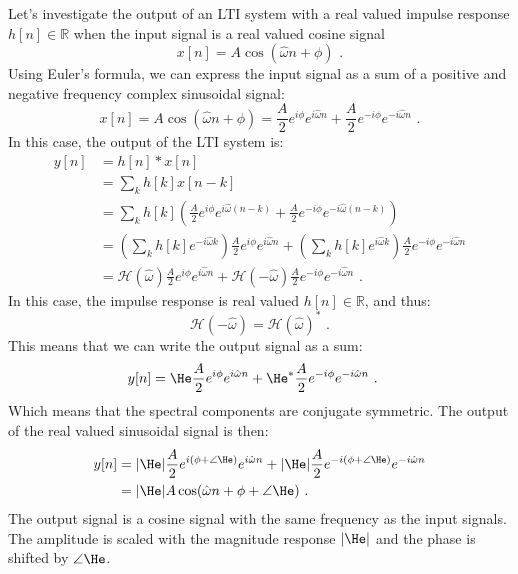 Let's investigate the output of an LTI system with a real valued
impulse response $h[n]\in\mathbb{R}$ when the input signal is a real
valued cosine signal
\begin{equation}
x[n] = A\cos(\hat{\omega} n + \phi)\,\,.
\end{equation}
Using Euler's formula, we can express the input signal as a sum of a
positive and negative frequency complex sinusoidal signal:
\begin{equation}
x[n] = A \cos(\hat{\omega} n + \phi) = \frac{A}{2}e^{i\phi}e^{i\hat{\omega} n} + \frac{A}{2}e^{-i\phi}e^{-i\hat{\omega} n}\,\,.
\end{equation}
In this case, the output of the LTI system is:
\begin{align}
y[n] &= h[n]*x[n]\\
&= \sum_{k} h[k]x[n-k]\\
&= \sum_{k} h[k] \left( \frac{A}{2}e^{i\phi}e^{i\hat{\omega} (n-k)} + \frac{A}{2}e^{-i\phi}e^{-i\hat{\omega} (n-k)} \right)\\
 &= \left(\sum_{k} h[k] e^{-i\hat{\omega} k}\right) \frac{A}{2}e^{i\phi}e^{i\hat{\omega} n} + \left(\sum_{k} h[k] e^{i\hat{\omega} k}\right) \frac{A}{2}e^{-i\phi} e^{-i\hat{\omega} n}\\
 &= \mathcal{H}(\hat{\omega}) \frac{A}{2}e^{i\phi}e^{i\hat{\omega} n} + \mathcal{H}(-\hat{\omega}) \frac{A}{2}e^{-i\phi}e^{-i\hat{\omega} n}\,\,.
 \end{align} 
In this case, the impulse response is real valued $h[n]\in \mathbb{R}$, and thus:
\begin{equation}
\mathcal{H}(-\hat{\omega}) = \mathcal{H}(\hat{\omega})^*\,\,.
\end{equation}
This means that we can write the output signal as a sum:
\begin{align}
y[n] &= \He \frac{A}{2}e^{i\phi}e^{i\hat{\omega} n} +  \He^*\frac{A}{2}e^{-i\phi} e^{-i\hat{\omega} n}\,\,.
\end{align}
Which means that the spectral components are conjugate symmetric. The output of the real valued sinusoidal signal is then:
\begin{align}
y[n] &= |\He|\frac{A}{2} e^{i(\phi + \angle \He)}e^{i\hat{\omega} n} + |\He|\frac{A}{2}e^{-i(\phi + \angle \He)} e^{-i\hat{\omega} n} \\
 & = |\He| A \cos(\hat{\omega} n + \phi + \angle \He)\,\,.
\end{align}
The output signal is a cosine signal with the same frequency as the
input signals. The amplitude is scaled with the magnitude response
$|\He|$ and the phase is shifted by $\angle \He$.

